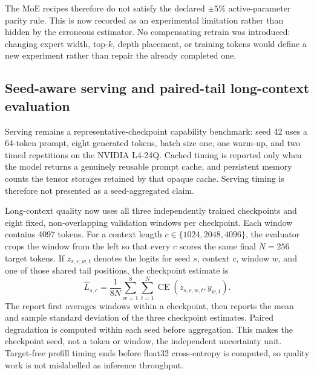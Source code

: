 \documentclass[11pt,a4paper]{article}
\theoremstyle{definition}
\theoremstyle{plain}
\begin{document}
The MoE recipes therefore do not satisfy the declared $\pm5\%$ active-parameter
parity rule.  This is now recorded as an experimental limitation rather than
hidden by the erroneous estimator.  No compensating retrain was introduced:
changing expert width, top-$k$, depth placement, or training tokens would define
a new experiment rather than repair the already completed one.

\subsection{Seed-aware serving and paired-tail long-context evaluation}

Serving remains a representative-checkpoint capability benchmark: seed 42 uses a
64-token prompt, eight generated tokens, batch size one, one warm-up, and two timed
repetitions on the NVIDIA L4-24Q.  Cached timing is reported only when the model
returns a genuinely reusable prompt cache, and persistent memory counts the tensor
storages retained by that opaque cache.  Serving timing is therefore not presented
as a seed-aggregated claim.

Long-context quality now uses all three independently trained checkpoints and eight
fixed, non-overlapping validation windows per checkpoint.  Each window contains
4097 tokens.  For a context length $c\in\{1024,2048,4096\}$, the evaluator crops
the window from the left so that every $c$ scores the same final $N=256$ target
tokens.  If $z_{s,c,w,t}$ denotes the logits for seed $s$, context $c$, window $w$,
and one of those shared tail positions, the checkpoint estimate is
\[
 \widehat{L}_{s,c}
 = \frac{1}{8N}\sum_{w=1}^{8}\sum_{t=1}^{N}
   \operatorname{CE}(z_{s,c,w,t}, y_{w,t}).
\]
The report first averages windows within a checkpoint, then reports the mean and
sample standard deviation of the three checkpoint estimates.  Paired degradation
is computed within each seed before aggregation.  This makes the checkpoint seed,
not a token or window, the independent uncertainty unit.  Target-free prefill
timing ends before float32 cross-entropy is computed, so quality work is not
mislabelled as inference throughput.
\end{document}
